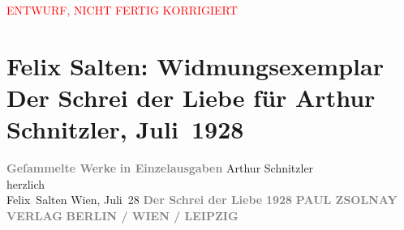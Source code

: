 
\begin{center}
            \textcolor{red}{ENTWURF, NICHT FERTIG KORRIGIERT}
                      \end{center}
            
         \renewcommand{\erwaehnteInstitutionen}{Institutionen: Paul Zsolnay Verlag}
         \renewcommand{\erwaehnteOrte}{Orte: Berlin, Leipzig, Wien}
         \renewcommand{\erwaehnteWerke}{Werke: Der Schrei der Liebe. Novellen}
               \section[Felix Salten: Widmungsexemplar Der Schrei der Liebe für Arthur Schnitzler, Juli 1928]{ Felix Salten: Widmungsexemplar Der Schrei der Liebe für Arthur
               Schnitzler, Juli 1928}\nopagebreak{}\rehead{ }\begin{ledgroupsized}[t]{13cm}\normalsize\beginnumbering \toendnotes[C]{\smallbreak\pagebreak[2]} 
\pstart
           \noindent{}\centering{}{\pb}\textcolor{gray}{\textbf{\textsc{}}}\pend
           \pstart
           \noindent{}\centering{}\textcolor{gray}{\textbf{Geſammelte Werke}}\pend
           \pstart
           \noindent{}\centering{}\textcolor{gray}{\textbf{in Einzelausgaben}}\pend
           \pstart
           \noindent{}Arthur Schnitzler {\\}herzlich {\\}\spacefill\mbox{Felix Salten}\pend
           \pstart
           Wien, Juli 28\pend
           {\bigskip}\pstart
           \noindent{}\centering{}{\pb}\textcolor{gray}{\textbf{\textsc{}}}\pend
           \pstart
           \noindent{}\centering{}\textcolor{gray}{\textbf{Der Schrei der Liebe}}\pend
           \pstart
           \noindent{}\centering{}\textcolor{gray}{\textbf{\textsc{}}}\pend
           {\bigskip}\pstart
           \noindent{}\centering{}\textcolor{gray}{\textbf{\textsc{1928}}}\pend
           \pstart
           \noindent{}\centering{}\textcolor{gray}{\textbf{\textsc{PAUL ZSOLNAY VERLAG}}}\pend
           \pstart
           \noindent{}\centering{}\textcolor{gray}{\textbf{\textsc{BERLIN / WIEN / LEIPZIG}}}\pend
           
         
         \endnumbering{}\end{ledgroupsized}  \newcommand{\dateiname}{L03044}\newcommand{\titel}{Felix Salten: Widmungsexemplar Der Schrei der Liebe für Arthur Schnitzler, Juli 1928}\newcommand{\editorInnen}{Martin Anton Müller und Laura Untner}
      